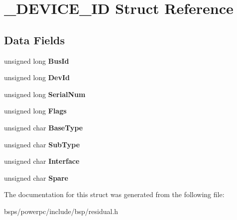 \hypertarget{struct__DEVICE__ID}{}\section{\+\_\+\+D\+E\+V\+I\+C\+E\+\_\+\+ID Struct Reference}
\label{struct__DEVICE__ID}
\subsection*{Data Fields}
\begin{DoxyCompactItemize}
\item 
\mbox{\label{struct__DEVICE__ID_a12552b05638325f43e4157c79790a29c}} 
unsigned long {\bfseries Bus\+Id}
\item 
\mbox{\label{struct__DEVICE__ID_a42069daa1f2cf9bffe3c081146a94ef2}} 
unsigned long {\bfseries Dev\+Id}
\item 
\mbox{\label{struct__DEVICE__ID_a8b18524e3801327c1f844d06c3ab420c}} 
unsigned long {\bfseries Serial\+Num}
\item 
\mbox{\label{struct__DEVICE__ID_a602755d3d2d656f8aec18b0fc4bf052e}} 
unsigned long {\bfseries Flags}
\item 
\mbox{\label{struct__DEVICE__ID_a12f70babc4a2b12b2dc3ec1b9c42d756}} 
unsigned char {\bfseries Base\+Type}
\item 
\mbox{\label{struct__DEVICE__ID_a385cf28c9ab5d63d7b3848a3d7066214}} 
unsigned char {\bfseries Sub\+Type}
\item 
\mbox{\label{struct__DEVICE__ID_abdea9edf6e6001992e20b76bc7a6229a}} 
unsigned char {\bfseries Interface}
\item 
\mbox{\label{struct__DEVICE__ID_a4bbe5e6d9002b15a653fb4e7cd84ea88}} 
unsigned char {\bfseries Spare}
\end{DoxyCompactItemize}


The documentation for this struct was generated from the following file\+:\begin{DoxyCompactItemize}
\item 
bsps/powerpc/include/bsp/residual.\+h\end{DoxyCompactItemize}
